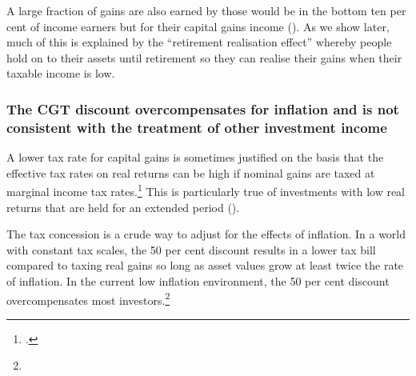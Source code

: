 \documentclass{grattan}\usepackage[]{graphicx}\usepackage[]{color}
\makeatletter
\newenvironment{kframe}{%
 \def\at@end@of@kframe{}%
 \ifinner\ifhmode%
  \def\at@end@of@kframe{\end{minipage}}%
  \begin{minipage}{\columnwidth}%
 \fi\fi%
 \def\FrameCommand##1{\hskip\@totalleftmargin \hskip-\fboxsep
 \colorbox{shadecolor}{##1}\hskip-\fboxsep
     \hskip-\linewidth \hskip-\@totalleftmargin \hskip\columnwidth}%
 \MakeFramed {\advance\hsize-\width
   \@totalleftmargin\z@ \linewidth\hsize
   \@setminipage}}%
 {\par\unskip\endMakeFramed%
 \at@end@of@kframe}
\newenvironment{knitrout}{}{} %
\makeatother
\begin{document}
A large fraction of gains are also earned by those would be in the bottom ten per cent of income earners but for their capital gains income (). As we show later, much of this is explained by the ``retirement realisation effect'' whereby people hold on to their assets until retirement so they can realise their gains when their taxable income is low. 


\subsubsection{The CGT discount overcompensates for inflation and is not consistent with the treatment of other investment income}
A lower tax rate for capital gains is sometimes justified on the basis that the effective tax rates on real returns can be high if nominal gains are taxed at marginal income tax rates.\footcite{Treasury2010} This is particularly true of investments with low real returns that are held for an extended period ().

The tax concession is a crude way to adjust for the effects of inflation. In a world with constant tax scales, the 50 per cent discount results in a lower tax bill compared to taxing real gains so long as asset values grow at least twice the rate of inflation. In the current low inflation environment, the 50 per cent discount overcompensates most investors.\footnote{}

\begin{knitrout}
\color{fgcolor}\begin{kframe}


{\ttfamily\noindent\bfseries\color{errorcolor}{\#\# Error in cut.default(SIH11BH.df\$wealth.hhold, breaks = SIHHHI.wealth5): object 'SIHHHI.wealth5' not found}}

{\ttfamily\noindent\bfseries\color{errorcolor}{\#\# Error in cut.default(SIH11BH.df\$income.total.an, breaks = SIHHHI.total.income5): object 'SIHHHI.total.income5' not found}}

{\ttfamily\noindent\bfseries\color{errorcolor}{\#\# Error in cut.default(SIH11BH.df\$income.disp.an, breaks = SIHHHI.disp.income5): object 'SIHHHI.disp.income5' not found}}\end{kframe}
\end{knitrout}
\end{document}
